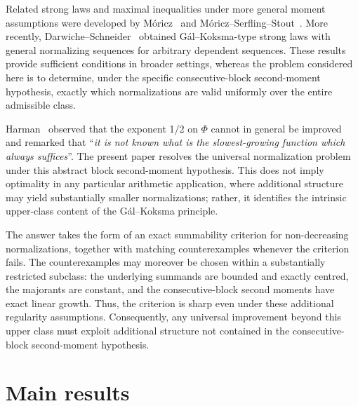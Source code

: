 \documentclass[12pt,reqno]{amsart}
\theoremstyle{definition}
\theoremstyle{plain}
\begin{document}
Related strong laws and maximal inequalities under more general moment assumptions were developed by M\'oricz~\cite{Moricz1976} and M\'oricz--Serfling--Stout~\cite{MoriczSerflingStout1982}. More recently, Darwiche--Schneider~\cite{DarwicheSchneider2023} obtained G\'al--Koksma-type strong laws with general normalizing sequences for arbitrary dependent sequences. These results provide sufficient conditions in broader settings, whereas the problem considered here is to determine, under the specific consecutive-block second-moment hypothesis, exactly which normalizations are valid uniformly over the entire admissible class.

Harman~\cite[p.~16]{Harman1998} observed that the exponent 1/2 on $\Phi$ cannot in general be improved and remarked that ``\textit{it is not known what is the slowest-growing function which always suffices}''. The present paper resolves the universal normalization problem under this abstract block second-moment hypothesis. This does not imply optimality in any particular arithmetic application, where additional structure may yield substantially smaller normalizations; rather, it identifies the intrinsic upper-class content of the G\'al--Koksma principle.

The answer takes the form of an exact summability criterion for non-decreasing normalizations, together with matching counterexamples whenever the criterion fails. The counterexamples may moreover be chosen within a substantially restricted subclass: the underlying summands are bounded and exactly centred, the majorants are constant, and the consecutive-block second moments have exact linear growth. Thus, the criterion is sharp even under these additional regularity assumptions. Consequently, any universal improvement beyond this upper class must exploit additional structure not contained in the consecutive-block second-moment hypothesis.

\section{Main results}\label{sec:main-results}
\end{document}
